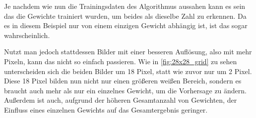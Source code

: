 Je nachdem wie nun die Trainingsdaten des Algorithmus aussahen kann es sein das die Gewichte trainiert wurden, um beides als dieselbe Zahl zu erkennen. Da es in diesem Beispiel nur von einem einzigen Gewicht abhängig ist, ist das sogar wahrscheinlich.\par
Nutzt man jedoch stattdessen Bilder mit einer besseren Auflösung, also mit mehr Pixeln, kann das nicht so einfach passieren. Wie in \ref{fig:28x28_grid} zu sehen unterscheiden sich die beiden Bilder um 18 Pixel, statt wie zuvor nur um 2 Pixel. Diese 18 Pixel bilden nun nicht nur einen größeren weißen Bereich, sondern es braucht auch mehr als nur ein einzelnes Gewicht, um die Vorhersage zu ändern. Außerdem ist auch, aufgrund der höheren Gesamtanzahl von Gewichten, der Einfluss eines einzelnen Gewichts auf das Gesamtergebnis geringer.\par
